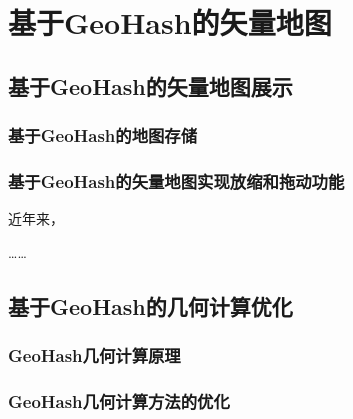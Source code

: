 \chapter{基于GeoHash的矢量地图}
\section{基于GeoHash的矢量地图展示}
\subsection{基于GeoHash的地图存储}
\subsection{基于GeoHash的矢量地图实现放缩和拖动功能}
近年来，

……

\section{基于GeoHash的几何计算优化}
\subsection{GeoHash几何计算原理}
\subsection{GeoHash几何计算方法的优化}